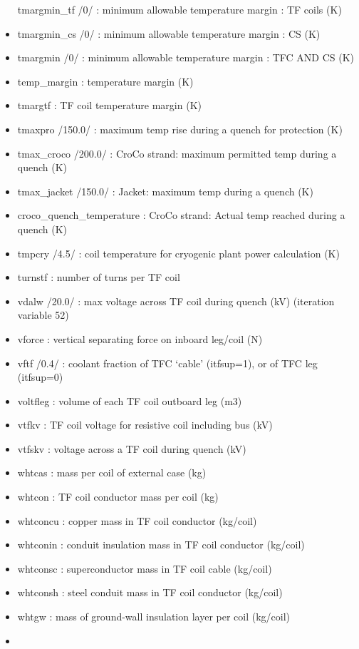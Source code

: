 \documentclass[]{article}
\begin{document}
\begin{itemize}
  tmargmin\_tf /0/ : minimum allowable temperature margin : TF coils (K)
\item
  tmargmin\_cs /0/ : minimum allowable temperature margin : CS (K)
\item
  tmargmin /0/ : minimum allowable temperature margin : TFC AND CS (K)
\item
  temp\_margin : temperature margin (K)
\item
  tmargtf : TF coil temperature margin (K)
\item
  tmaxpro /150.0/ : maximum temp rise during a quench for protection (K)
\item
  tmax\_croco /200.0/ : CroCo strand: maximum permitted temp during a
  quench (K)
\item
  tmax\_jacket /150.0/ : Jacket: maximum temp during a quench (K)
\item
  croco\_quench\_temperature : CroCo strand: Actual temp reached during
  a quench (K)
\item
  tmpcry /4.5/ : coil temperature for cryogenic plant power calculation
  (K)
\item
  turnstf : number of turns per TF coil
\item
  vdalw /20.0/ : max voltage across TF coil during quench (kV)
  (iteration variable 52)
\item
  vforce : vertical separating force on inboard leg/coil (N)
\item
  vftf /0.4/ : coolant fraction of TFC `cable' (itfsup=1), or of TFC leg
  (itfsup=0)
\item
  voltfleg : volume of each TF coil outboard leg (m3)
\item
  vtfkv : TF coil voltage for resistive coil including bus (kV)
\item
  vtfskv : voltage across a TF coil during quench (kV)
\item
  whtcas : mass per coil of external case (kg)
\item
  whtcon : TF coil conductor mass per coil (kg)
\item
  whtconcu : copper mass in TF coil conductor (kg/coil)
\item
  whtconin : conduit insulation mass in TF coil conductor (kg/coil)
\item
  whtconsc : superconductor mass in TF coil cable (kg/coil)
\item
  whtconsh : steel conduit mass in TF coil conductor (kg/coil)
\item
  whtgw : mass of ground-wall insulation layer per coil (kg/coil)
\item

\end{itemize}
\end{document}
